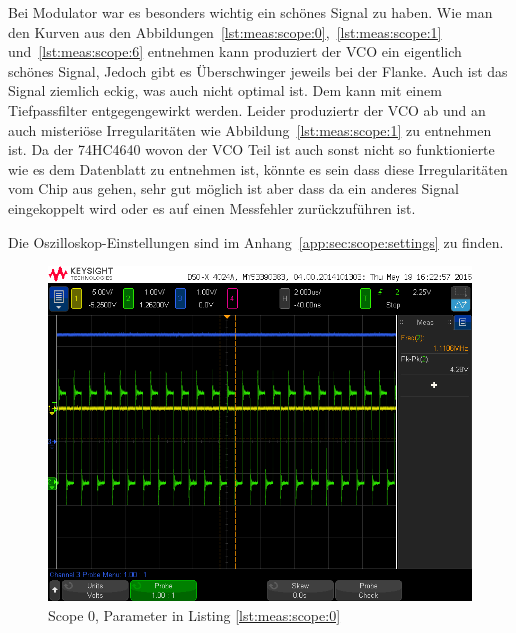 Bei Modulator war es besonders wichtig ein schönes Signal zu haben.
Wie man den Kurven aus den Abbildungen~\ref{lst:meas:scope:0},~\ref{lst:meas:scope:1} und~\ref{lst:meas:scope:6} entnehmen kann produziert der VCO ein eigentlich schönes Signal, Jedoch gibt es Überschwinger jeweils bei der Flanke. Auch ist das Signal ziemlich eckig, was auch nicht optimal ist. Dem kann mit einem Tiefpassfilter entgegengewirkt werden.
Leider produziertr der VCO ab und an auch misteriöse Irregularitäten wie Abbildung~\ref{lst:meas:scope:1} zu entnehmen ist. Da der 74HC4640 wovon der VCO Teil ist auch sonst nicht so funktionierte wie es dem Datenblatt zu entnehmen ist, könnte es sein dass diese Irregularitäten vom Chip aus gehen, sehr gut möglich ist aber dass da ein anderes Signal eingekoppelt wird oder es auf einen Messfehler zurückzuführen ist.

Die Oszilloskop-Einstellungen sind im Anhang~\ref{app:sec:scope:settings} zu finden.

\begin{figure}[h!tb]
    \centering
    \includegraphics[width=1\textwidth, trim=0mm 21mm 0mm 11mm, clip]{images/scopeShots/scope_0.png}
    \caption{Scope 0, Parameter in Listing \ref{lst:meas:scope:0}}
    \label{fig:meas:scope:0}
\end{figure}


